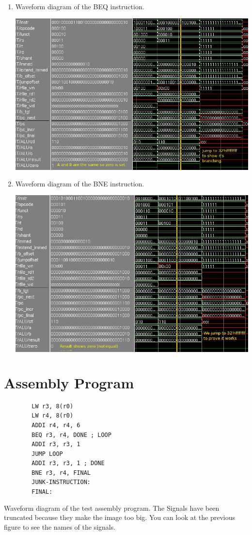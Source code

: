 \documentclass[12pt]{article}
\begin{document}
\begin{enumerate}
    \item
    Waveform diagram of the BEQ instruction.

    \centerline{\includegraphics[scale=0.55]{img/beq_wave.png}}

    \item
    Waveform diagram of the BNE instruction.

    \centerline{\includegraphics[scale=0.55]{img/bne_wave.png}}

\end{enumerate}

\section{Assembly Program}
\begin{verbatim}
        LW r3, 8(r0)
        LW r4, 8(r0)
        ADDI r4, r4, 6
        BEQ r3, r4, DONE ; LOOP
        ADDI r3, r3, 1
        JUMP LOOP
        ADDI r3, r3, 1 ; DONE
        BNE r3, r4, FINAL
        JUNK-INSTRUCTION:
        FINAL:
\end{verbatim}
    Waveform diagram of the test assembly program. The Signals have been truncated because they make the image too big. You can look at the previous figure to see the names of the signals.
\end{document}
